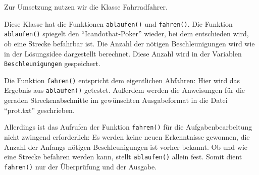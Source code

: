 	Zur Umsetzung nutzen wir die Klasse Fahrradfahrer.
	
	Diese Klasse hat die Funktionen \texttt{ablaufen()} und \texttt{fahren()}.
	Die Funktion \texttt{ablaufen()} spiegelt den "`Icandothat-Poker"' wieder, bei dem entschieden wird, ob eine Strecke befahrbar ist. Die Anzahl der nötigen Beschleunigungen wird wie in der Lösungsidee dargestellt berechnet. Diese Anzahl wird in der Variablen \texttt{Beschleunigungen} gespeichert.

	Die Funktion \texttt{fahren()} entspricht dem eigentlichen Abfahren: Hier wird das Ergebnis aus \texttt{ablaufen()} getestet. Außerdem werden die Anweisungen für die geraden Streckenabschnitte im gewünschten Ausgabeformat in die Datei "`prot.txt"' geschrieben. 

	Allerdings ist das Aufrufen der Funktion \texttt{fahren()} für die Aufgabenbearbeitung nicht zwingend erforderlich: Es werden keine neuen Erkenntnisse gewonnen, die Anzahl der Anfangs nötigen Beschleunigungen ist vorher bekannt.  Ob und wie eine Strecke befahren werden kann, stellt \texttt{ablaufen()} allein fest. Somit dient \texttt{fahren()} nur der Überprüfung und der Ausgabe.